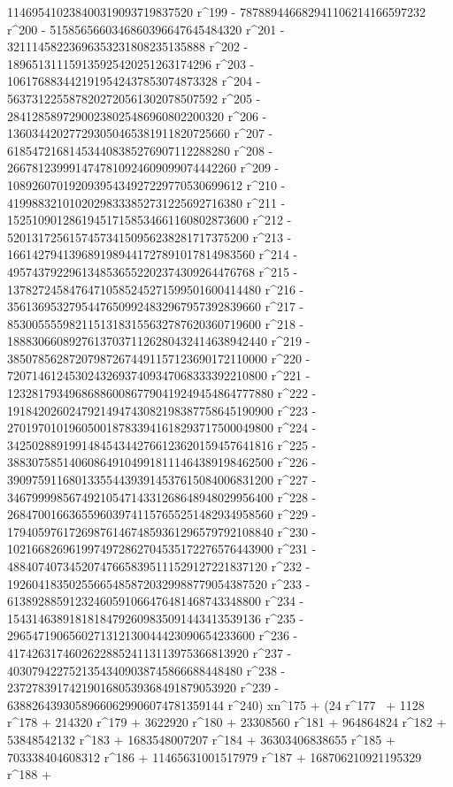        114695410238400319093719837520 r^199 - 
       787889446682941106214166597232 r^200 - 
       5158565660346860396647645484320 r^201 - 
       32111458223696353231808235135888 r^202 - 
       189651311159135925420251263174296 r^203 - 
       1061768834421919542437853074873328 r^204 - 
       5637312255878202720561302078507592 r^205 - 
       28412858972900238025486960802200320 r^206 - 
       136034420277293050465381911820725660 r^207 - 
       618547216814534408385276907112288280 r^208 - 
       2667812399914747810924609099074442260 r^209 - 
       10892607019209395434927229770530699612 r^210 - 
       41998832101020298333852731225692716380 r^211 - 
       152510901286194517158534661160802873600 r^212 - 
       520131725615745734150956238281717375200 r^213 - 
       1661427941396891989441727891017814983560 r^214 - 
       4957437922961348536552202374309264476768 r^215 - 
       13782724584764710585245271599501600414480 r^216 - 
       35613695327954476509924832967957392839660 r^217 - 
       85300555598211513183155632787620360719600 r^218 - 
       188830660892761370371126280432414638942440 r^219 - 
       385078562872079872674491157123690172110000 r^220 - 
       720714612453024326937409347068333392210800 r^221 - 
       1232817934968688600867790419249454864777880 r^222 - 
       1918420260247921494743082198387758645190900 r^223 - 
       2701970101960500187833941618293717500049800 r^224 - 
       3425028891991484543442766123620159457641816 r^225 - 
       3883075851406086491049918111464389198462500 r^226 - 
       3909759116801335544393914537615084006831200 r^227 - 
       3467999985674921054714331268648948029956400 r^228 - 
       2684700166365596039741157655251482934958560 r^229 - 
       1794059761726987614674859361296579792108840 r^230 - 
       1021668269619974972862704535172276576443900 r^231 - 
       488407407345207476658395111529127221837120 r^232 - 
       192604183502556654858720329988779054387520 r^233 - 
       61389288591232460591066476481468743348800 r^234 - 
       15431463891818184792609835091443413539136 r^235 - 
       2965471906560271312130044423090654233600 r^236 - 
       417426317460262288524113113975366813920 r^237 - 
       40307942275213543409038745866688448480 r^238 - 
       2372783917421901680539368491879053920 r^239 - 
       63882643930589660629906074781359144 r^240) xn^175 + (24 r^177 \
+ 1128 r^178 + 214320 r^179 + 3622920 r^180 + 23308560 r^181 + 
       964864824 r^182 + 53848542132 r^183 + 1683548007207 r^184 + 
       36303406838655 r^185 + 703338404608312 r^186 + 
       11465631001517979 r^187 + 168706210921195329 r^188 + 
